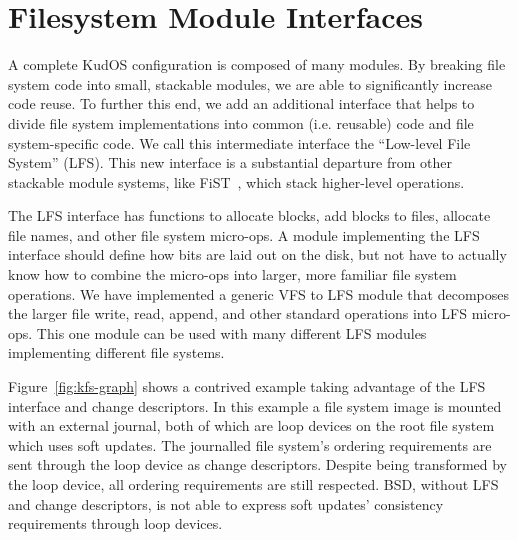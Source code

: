 \preparagraphspacing{}
\section*{Filesystem Module Interfaces}
\label{sec:interfaces}

A complete KudOS configuration is composed of many modules.
By breaking file system code into
small, stackable modules, we are able to significantly increase code reuse. To
further this end, we add an additional interface that helps to divide file system
implementations into common (i.e. reusable) code and file system-specific code.
We call this intermediate interface the ``Low-level File System'' (LFS). This
new interface is a substantial departure from other stackable module systems,
like FiST~\cite{zadok00fist}, which stack higher-level operations.

The LFS interface has functions to allocate blocks, add blocks to
files, allocate file names, and other file system micro-ops. A module
implementing the LFS interface should define how bits are laid out on
the disk, but not have to actually know how to combine the micro-ops
into larger, more familiar file system operations. We have implemented
a generic VFS to LFS module that decomposes the larger file write,
read, append, and other standard operations into LFS micro-ops. This
one module can be used with many different LFS modules implementing
different file systems.

Figure~\ref{fig:kfs-graph} shows a contrived example taking advantage of the LFS
interface and change descriptors. In this example a file system image is mounted
with an external journal, both of which are loop devices on the root file system
which uses soft updates. The journalled file system's ordering requirements are
sent through the loop device as change descriptors. Despite being transformed
by the loop device, all ordering requirements are still respected.
%
BSD, without LFS and change descriptors, is not able to express soft updates'
consistency requirements through loop devices.